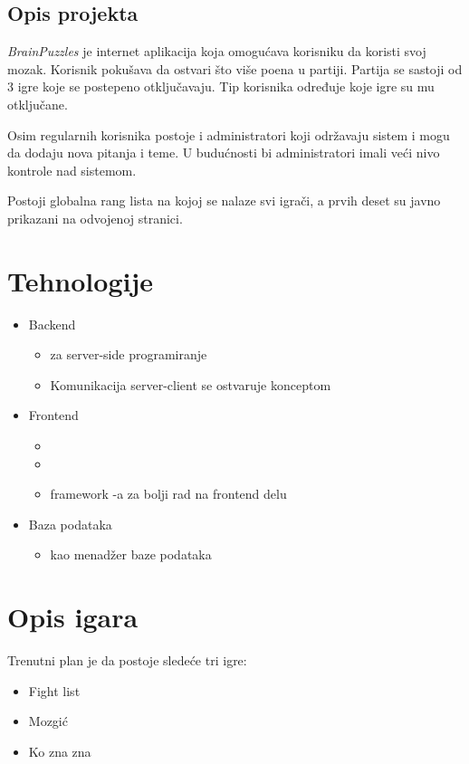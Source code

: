 \documentclass{article}
\begin{document}
\subsection{Opis projekta}
\par \textit{BrainPuzzles} je internet aplikacija koja omogućava korisniku da koristi svoj mozak. 
Korisnik pokušava da ostvari što više poena u partiji. Partija se sastoji od 3 igre koje se 
postepeno otključavaju. Tip korisnika određuje koje igre su mu otključane. 
\par Osim regularnih korisnika postoje i administratori koji održavaju sistem i mogu da 
dodaju nova pitanja i teme. U budućnosti bi administratori imali veći nivo kontrole nad 
sistemom. 
\par Postoji globalna rang lista na kojoj se nalaze svi igrači, a prvih deset su javno prikazani na 
odvojenoj stranici.
\newpage
\section{Tehnologije}
\begin{itemize}
    \item Backend
    \begin{itemize}
        \item {} za server-side programiranje
        \item Komunikacija server-client se ostvaruje  konceptom
    \end{itemize}
    \item Frontend
    \begin{itemize}
        \item {}
        \item {}
        \item {} framework -a za bolji rad na frontend delu
    \end{itemize}
    \item Baza podataka
    \begin{itemize}
        \item {} kao menadžer baze podataka
    \end{itemize}
\end{itemize}
\newpage
\section{Opis igara}
Trenutni plan je da postoje sledeće tri igre:
\begin{itemize}
    \item Fight list
    \item Mozgić
    \item Ko zna zna
\end{itemize}
\end{document}
